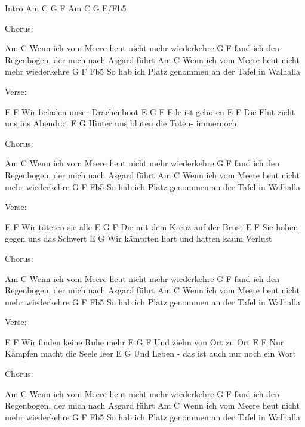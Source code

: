Intro
Am  C  G  F  Am  C  G  F/Fb5

Chorus:

Am                                 C
Wenn ich vom Meere heut nicht mehr wiederkehre
             G                         F
fand ich den Regenbogen, der mich nach Asgard führt
Am                                 C
Wenn ich vom Meere heut nicht mehr wiederkehre
G                                F                Fb5
So hab ich Platz genommen an der Tafel in Walhalla

Verse:

E                 F
Wir beladen unser Drachenboot
E        G     F
Eile ist geboten
E                      F
Die Flut zieht uns ins Abendrot
E                     G
Hinter uns bluten die Toten- immernoch

Chorus:

Am                                 C
Wenn ich vom Meere heut nicht mehr wiederkehre
             G                         F
fand ich den Regenbogen, der mich nach Asgard führt
Am                                 C
Wenn ich vom Meere heut nicht mehr wiederkehre
           G                     F                Fb5
So hab ich Platz genommen an der Tafel in Walhalla

Verse:

E               F
Wir töteten sie alle
E                         G  F
Die mit dem Kreuz auf der Brust
E                       F
Sie hoben gegen uns das Schwert
E                                 G
Wir kämpften hart und hatten kaum Verlust

Chorus:

Am                                 C
Wenn ich vom Meere heut nicht mehr wiederkehre
             G                         F
fand ich den Regenbogen, der mich nach Asgard führt
Am                                 C
Wenn ich vom Meere heut nicht mehr wiederkehre
           G                     F                Fb5
So hab ich Platz genommen an der Tafel in Walhalla

Verse:

E                F
Wir finden keine Ruhe mehr
E                    G  F
Und ziehn von Ort zu Ort
E                     F
Nur Kämpfen macht die Seele leer
E                                     G
Und Leben - das ist auch nur noch ein Wort

Chorus:

Am                                 C
Wenn ich vom Meere heut nicht mehr wiederkehre
             G                         F
fand ich den Regenbogen, der mich nach Asgard führt
Am                                 C
Wenn ich vom Meere heut nicht mehr wiederkehre
           G                     F                Fb5
So hab ich Platz genommen an der Tafel in Walhalla

